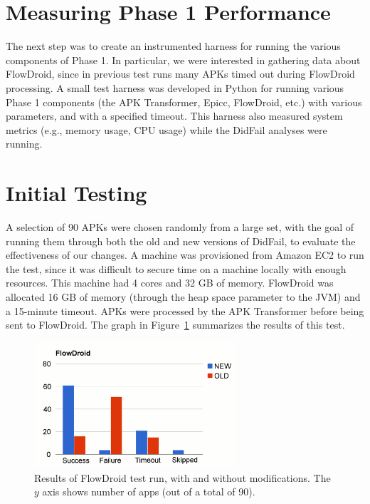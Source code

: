 \section{Measuring Phase 1 Performance}
The next step was to create an instrumented harness for running the various components of Phase 1.  In particular, we were interested in gathering data about FlowDroid, since in previous test runs many APKs timed out during FlowDroid processing.  A small test harness was developed in Python for running various Phase 1 components (the APK Transformer, Epicc, FlowDroid, etc.) with various parameters, and with a specified timeout.  This harness also measured system metrics (e.g., memory usage, CPU usage) while the DidFail analyses were running.  

\section{Initial Testing}
A selection of 90 APKs were chosen randomly from a large set, with the goal of running them through both the old and new versions of DidFail, to evaluate the effectiveness of our changes.  A machine was provisioned from Amazon EC2 to run the test, since it was difficult to secure time on a machine locally with enough resources.  This machine had 4 cores and 32 GB of memory.  FlowDroid was allocated 16 GB of memory (through the heap space parameter to the JVM) and a 15-minute timeout.  APKs were processed by the APK Transformer before being sent to FlowDroid.  The graph in Figure~\ref{fig:initial_phase1} summarizes the results of this test.

\begin{figure}[h]
	\centering
	\begin{minipage}{0.85\textwidth}
	\centering
	\includegraphics[width=0.66\textwidth]{flowdroid_success2.png}
	\caption[Results of FlowDroid test run, with and without modifications.]{Results of FlowDroid test run, with and without modifications. The $y$ axis shows number of apps (out of a total of 90).}
	\label{fig:initial_phase1}
	\end{minipage}
\end{figure}

